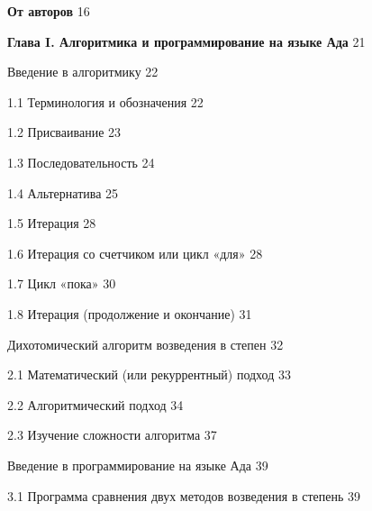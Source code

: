 \documentclass{mai_book}
\begin{document}
{\noindent \textbf{От авторов} \dotfill \hspace{0.5cm} 16\newline

\noindent \textbf{Глава I. Алгоритмика и программирование на языке Ада} \dotfill \hspace{0.5cm} 21 

 \hspace{0.05cm} Введение в алгоритмику \dotfill \hspace{0.5cm} 22 

1.1 Терминология и обозначения \dotfill \hspace{0.5cm} 22 

1.2 Присваивание \dotfill \hspace{0.5cm} 23 

1.3 Последовательность \dotfill \hspace{0.5cm} 24
 
   1.4 Альтернатива \dotfill \hspace{0.5cm} 25 
   
   1.5 Итерация \dotfill \hspace{0.5cm} 28
   
    1.6 Итерация со счетчиком или цикл «для» \dotfill \hspace{0.5cm} 28 
    
    1.7 Цикл «пока» \dotfill \hspace{0.5cm} 30 
    
    1.8 Итерация (продолжение и окончание) \dotfill \hspace{0.5cm} 31
    
 \hspace{0.05cm} Дихотомический алгоритм возведения в степен \dotfill \hspace{0.5cm} 32
    
    2.1 Математический (или рекуррентный) подход \dotfill \hspace{0.5cm} 33
    
    2.2 Алгоритмический подход  \dotfill \hspace{0.5cm} 34
    
    2.3 Изучение сложности алгоритма \dotfill \hspace{0.5cm} 37
    
 \hspace{0.05cm} Введение в программирование на языке Ада \dotfill \hspace{0.5cm} 39 
    
    3.1 Программа сравнения двух методов возведения в степень \dotfill \hspace{0.5cm} 39 
    
}
\end{document}
